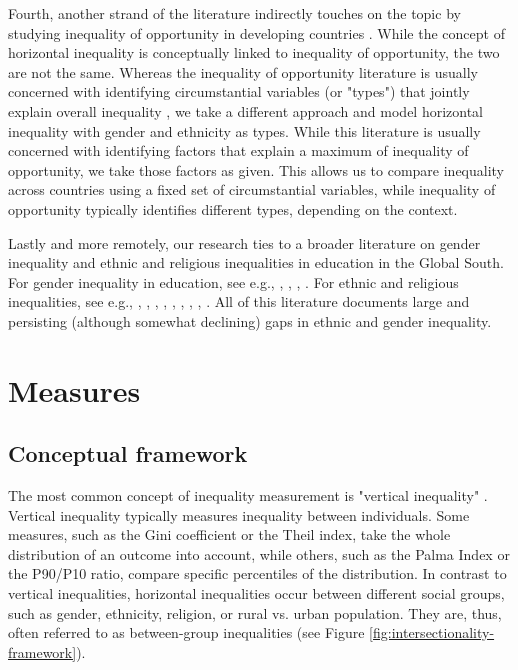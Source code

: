 Fourth, another strand of the literature indirectly touches on the topic by studying inequality of opportunity in developing countries \citep{Ferreira2018, Brunori2019}. While the concept of horizontal inequality is conceptually linked to inequality of opportunity, the two are not the same. Whereas the inequality of opportunity literature is usually concerned with identifying circumstantial variables (or "types") that jointly explain overall inequality \citep[see e.g.,][]{Brunori2021}, we take a different approach and model horizontal inequality with gender and ethnicity as types.  While this literature is usually concerned with identifying factors that explain a maximum of inequality of opportunity, we take those factors as given. This allows us to compare inequality across countries using a fixed set of circumstantial variables, while inequality of opportunity typically identifies different types, depending on the context.

Lastly and more remotely, our research ties to a broader literature on gender inequality and ethnic and religious inequalities in education in the Global South. For gender inequality in education, see e.g., \cite{King1995}, \cite{Lopus2018}, \cite{Klasen2002}, \cite{Klasen2009}. For ethnic and religious inequalities, see e.g., \cite{Easterly1997}, \cite{Montalvo2003}, \cite{Montalvo2005}, \cite{Alesina2016}, \cite{Houle2017}, \cite{Muller2017}, \cite{Alcorta2018}, \cite{Cooray2011}, \cite{Hajj2009}. All of this literature documents large and persisting (although somewhat declining) gaps in ethnic and gender inequality.


\hypertarget{measures}{%
\section{Measures}\label{measures}}

\hypertarget{conceptual-framework}{%
\subsection{Conceptual framework}\label{conceptual-framework}}

The most common concept of inequality measurement is "vertical inequality" \citep{Bourguignon1979, Cowell1988, Lambert1993}. Vertical inequality typically measures inequality between individuals. Some measures, such as the Gini coefficient or the Theil index, take the whole distribution of an outcome into account, while others, such as the Palma Index or the P90/P10 ratio, compare specific percentiles of the distribution. In contrast to vertical inequalities, horizontal inequalities occur between different social groups, such as gender, ethnicity, religion, or rural vs. urban population. They are, thus, often referred to as between-group inequalities (see Figure \ref{fig:intersectionality-framework}). 

